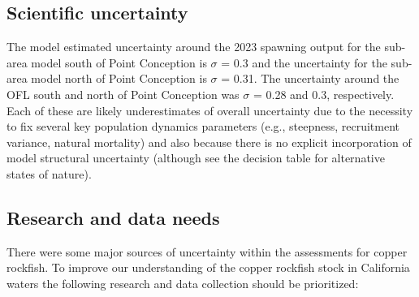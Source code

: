 \documentclass[11pt,
  letterpaper,
]{article}
\begin{document}
\pagebreak



\pagebreak

\subsection*{Scientific uncertainty}\label{scientific-uncertainty}

The model estimated uncertainty around the 2023 spawning output for the sub-area model south of Point Conception is \(\sigma\) = 0.3 and the uncertainty for the sub-area model north of Point Conception is \(\sigma\) = 0.31. The uncertainty around the OFL south and north of Point Conception was \(\sigma\) = 0.28 and 0.3, respectively. Each of these are likely underestimates of overall uncertainty due to the necessity to fix several key population dynamics parameters (e.g., steepness, recruitment variance, natural mortality) and also because there is no explicit incorporation of model structural uncertainty (although see the decision table for alternative states of nature).

\subsection*{Research and data needs}\label{research-and-data-needs}

There were some major sources of uncertainty within the assessments for copper rockfish. To improve our understanding of the copper rockfish stock in California waters the following research and data collection should be prioritized:
\end{document}
